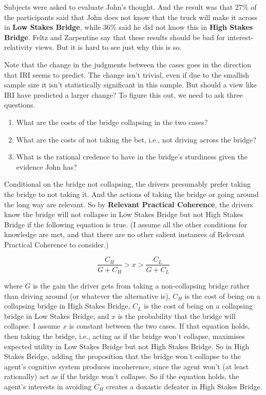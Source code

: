 \noindent Subjects were asked to evaluate John's thought. And the result was that 27\% of the participants said that John does not know that the truck will make it across in \textbf{Low Stakes Bridge}, while 36\% said he did not know this in \textbf{High Stakes Bridge}. Feltz and Zarpentine say that these results should be bad for interest-relativity views. But it is hard to see just why this is so.

Note that the change in the judgments between the cases goes in the direction that IRI seems to predict. The change isn't trivial, even if due to the smallish sample size it isn't statistically significant in this sample. But should a view like IRI have predicted a larger change? To figure this out, we need to ask three questions.

\begin{enumerate}
\item What are the costs of the bridge collapsing in the two cases?
\item What are the costs of not taking the bet, i.e., not driving across the bridge?
\item What is the rational credence to have in the bridge's sturdiness given the evidence John has?
\end{enumerate}

Conditional on the bridge not collapsing, the drivers presumably prefer taking the bridge to not taking it. And the actions of taking the bridge or going around the long way are relevant. So by \textbf{Relevant Practical Coherence}, the drivers know the bridge will not collapse in Low Stakes Bridge but not High Stakes Bridge  if the following equation is true. (I assume all the other conditions for knowledge are met, and that there are no other salient instances of Relevant Practical Coherence to consider.)

\begin{equation}
\frac{C_H}{G + C_H} > x > \frac{C_L}{G + C_L}
\end{equation}

\noindent where $G$ is the gain the driver gets from taking a non-collapsing bridge rather than driving around (or whatever the alternative is), $C_H$ is the cost of being on a collapsing bridge in High Stakes Bridge, $C_L$ is the cost of being on a collapsing bridge in Low Stakes Bridge, and $x$ is the probability that the bridge will collapse. I assume $x$ is constant between the two cases. If that equation holds, then taking the bridge, i.e., acting as if the bridge won't collapse, maximises expected utility in Low Stakes Bridge but not High Stakes Bridge. So in High Stakes Bridge, adding the proposition that the bridge won't collapse to the agent's cognitive system produces incoherence, since the agent won't (at least rationally) act as if the bridge won't collapse. So if the equation holds, the agent's interests in avoiding $C_H$ creates a doxastic defeater in High Stakes Bridge.

